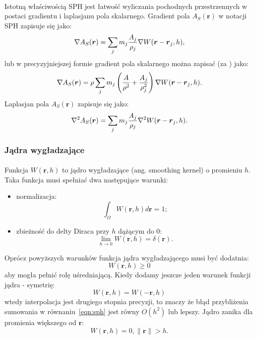 \paragraph{}
Istotną właściwością SPH jest łatwość wyliczania pochodnych przestrzennych w postaci gradientu i laplasjanu pola skalarnego. Gradient pola $A_S(\boldsymbol{r})$ w notacji SPH zapisuje się jako:
\begin{equation}
\nabla A_S(\boldsymbol{r}) = \sum\limits_{j} m_j {A_j \over\rho_j} \nabla W(\boldsymbol{r}-\boldsymbol{r}_j, h),
\label{eqn:sph_grad}
\end{equation}
lub w precyzyjniejszej formie gradient pola skalarnego można zapisać (za \cite{kelager06}) jako:
\begin{equation}
\nabla A_S(\boldsymbol{r}) = \rho \sum\limits_{j} m_j \left( {A \over \rho^2} + {A_j \over \rho_j^2} \right) \nabla W(\boldsymbol{r}-\boldsymbol{r}_j, h).
\label{eqn:sph_grad_prec}
\end{equation}
Laplasjan pola $A_S(\boldsymbol{r})$ zapisuje się jako:
\begin{equation}
\nabla^2 A_S(\boldsymbol{r}) = \sum\limits_{j} m_j {A_j \over\rho_j} \nabla^2 W(\boldsymbol{r}-\boldsymbol{r}_j, h).
\label{eqn:sph_lap}
\end{equation}
\par

\subsubsection{Jądra wygładzające}

\paragraph{}
Funkcja $W(\boldsymbol{r}, h)$ to jądro wygładzające (ang. smoothing kernel) o promieniu $h$. Taka funkcja musi spełniać dwa następujące warunki:
\begin{itemize}
\item normalizacja: $$\int_{\Omega} W(\boldsymbol{r}, h) d\boldsymbol{r} = 1;$$
\item zbieżność do delty Diraca przy $h$ dążącym do 0: $$\lim_{h\to0} W(\boldsymbol{r}, h) = \delta(\boldsymbol{r}).$$
\end{itemize}
\vspace{3ex}
\noindent
Oprócz powyższych warunków funkcja jądra wygładzającego musi być dodatnia: $$W(\boldsymbol{r}, h) \ge 0$$ aby mogła pełnić rolę uśredniającą. Kiedy dodamy jeszcze jeden warunek funkcji jądra - symetrię: $$W(\boldsymbol{r}, h) = W(\boldsymbol{-r}, h)$$ wtedy interpolacja jest drugiego stopnia precyzji, to znaczy że błąd przybliżenia sumowania w równaniu~\eqref{eqn:sph} jest równy $O(h^{2})$ lub lepszy. Jądro zanika dla promienia większego od $\boldsymbol{r}$: $$W(\boldsymbol{r}, h) = 0, \| \mathbf{r} \| > h.$$
\par


